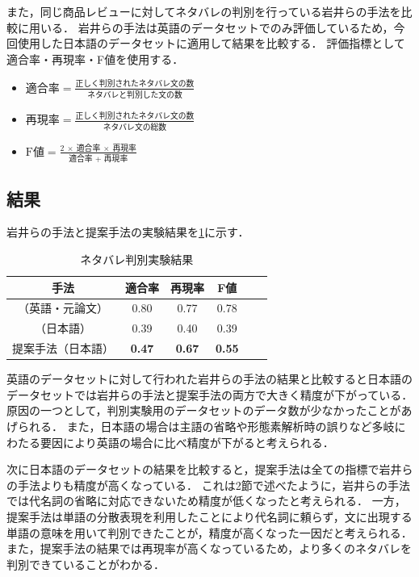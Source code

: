 \documentclass[autodetect-engine,dvipdfmx-if-dvi,ja=standard,a4j,jbase=10.5pt,twoside,twocolumn,magstyle=nomag*]{bxjsarticle}
\begin{document}
また，同じ商品レビューに対してネタバレの判別を行っている岩井らの手法を比較に用いる．
岩井らの手法は英語のデータセットでのみ評価しているため，今回使用した日本語のデータセットに適用して結果を比較する．
評価指標として適合率・再現率・F値を使用する．
\begin{itemize}
  \item $\text{適合率} = \frac{\text{正しく判別されたネタバレ文の数}}{\text{ネタバレと判別した文の数}}$
  \item $\text{再現率} = \frac{\text{正しく判別されたネタバレ文の数}}{\text{ネタバレ文の総数}}$
  \item $\text{F値} = \frac{2\ \times\ \text{適合率} \ \times\ \text{再現率}}{\text{適合率 + 再現率}}$
\end{itemize}

\subsection{結果}
岩井らの手法と提案手法の実験結果を\cref{tab:kanren_exp}に示す．
\begin{table}[pt]
  \centering
  \caption{ネタバレ判別実験結果 \label{tab:kanren_exp}}
  \begin{tabular}{cccccc}
    \toprule %
    手法 & 適合率 & 再現率 & F値 \\ \midrule %
    \cite{iwai2}（英語・元論文） & 0.80 & 0.77 & 0.78 \\
    \cite{iwai2}（日本語） & 0.39 & 0.40 & 0.39 \\
    提案手法（日本語） & \textbf{0.47} & \textbf{0.67} & \textbf{0.55} \\
    \bottomrule %
  \end{tabular}
\end{table}
英語のデータセットに対して行われた岩井らの手法の結果と比較すると日本語のデータセットでは岩井らの手法と提案手法の両方で大きく精度が下がっている．
原因の一つとして，判別実験用のデータセットのデータ数が少なかったことがあげられる．
また，日本語の場合は主語の省略や形態素解析時の誤りなど多岐にわたる要因により英語の場合に比べ精度が下がると考えられる．

次に日本語のデータセットの結果を比較すると，提案手法は全ての指標で岩井らの手法よりも精度が高くなっている．
これは2節で述べたように，岩井らの手法では代名詞の省略に対応できないため精度が低くなったと考えられる．
一方，提案手法は単語の分散表現を利用したことにより代名詞に頼らず，文に出現する単語の意味を用いて判別できたことが，精度が高くなった一因だと考えられる．
また，提案手法の結果では再現率が高くなっているため，より多くのネタバレを判別できていることがわかる．
\end{document}
